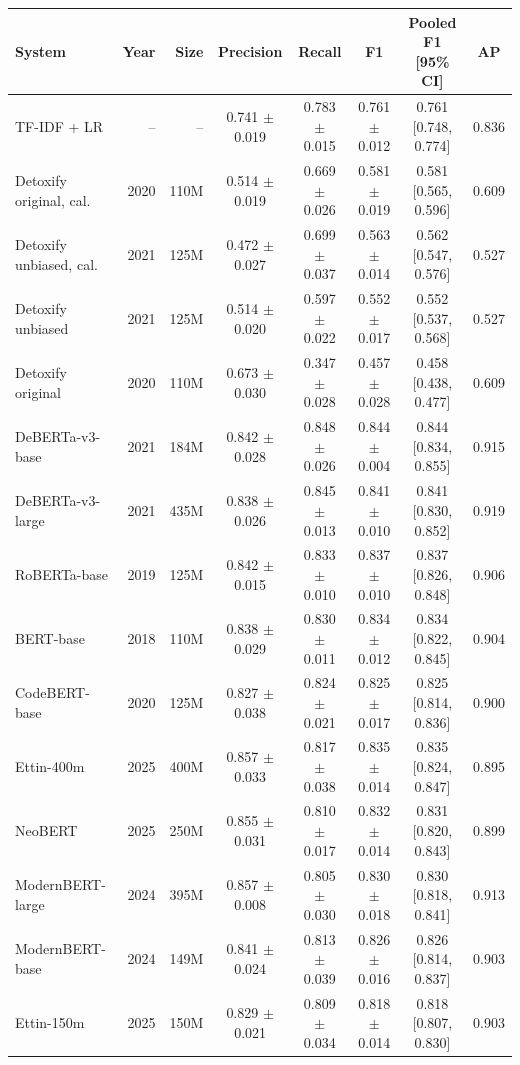 \begin{tabular}{lrrccccc}
\toprule
System & Year & Size & Precision & Recall & F1 & Pooled F1 [95\% CI] & AP \\
\midrule
TF-IDF + LR & -- & -- & 0.741 $\pm$ 0.019 & 0.783 $\pm$ 0.015 & 0.761 $\pm$ 0.012 & 0.761 [0.748, 0.774] & 0.836 \\
\midrule
Detoxify original, cal. & 2020 & 110M & 0.514 $\pm$ 0.019 & 0.669 $\pm$ 0.026 & 0.581 $\pm$ 0.019 & 0.581 [0.565, 0.596] & 0.609 \\
Detoxify unbiased, cal. & 2021 & 125M & 0.472 $\pm$ 0.027 & 0.699 $\pm$ 0.037 & 0.563 $\pm$ 0.014 & 0.562 [0.547, 0.576] & 0.527 \\
Detoxify unbiased & 2021 & 125M & 0.514 $\pm$ 0.020 & 0.597 $\pm$ 0.022 & 0.552 $\pm$ 0.017 & 0.552 [0.537, 0.568] & 0.527 \\
Detoxify original & 2020 & 110M & 0.673 $\pm$ 0.030 & 0.347 $\pm$ 0.028 & 0.457 $\pm$ 0.028 & 0.458 [0.438, 0.477] & 0.609 \\
\midrule
DeBERTa-v3-base & 2021 & 184M & 0.842 $\pm$ 0.028 & 0.848 $\pm$ 0.026 & 0.844 $\pm$ 0.004 & 0.844 [0.834, 0.855] & 0.915 \\
DeBERTa-v3-large & 2021 & 435M & 0.838 $\pm$ 0.026 & 0.845 $\pm$ 0.013 & 0.841 $\pm$ 0.010 & 0.841 [0.830, 0.852] & 0.919 \\
RoBERTa-base & 2019 & 125M & 0.842 $\pm$ 0.015 & 0.833 $\pm$ 0.010 & 0.837 $\pm$ 0.010 & 0.837 [0.826, 0.848] & 0.906 \\
BERT-base & 2018 & 110M & 0.838 $\pm$ 0.029 & 0.830 $\pm$ 0.011 & 0.834 $\pm$ 0.012 & 0.834 [0.822, 0.845] & 0.904 \\
CodeBERT-base & 2020 & 125M & 0.827 $\pm$ 0.038 & 0.824 $\pm$ 0.021 & 0.825 $\pm$ 0.017 & 0.825 [0.814, 0.836] & 0.900 \\
\midrule
Ettin-400m & 2025 & 400M & 0.857 $\pm$ 0.033 & 0.817 $\pm$ 0.038 & 0.835 $\pm$ 0.014 & 0.835 [0.824, 0.847] & 0.895 \\
NeoBERT & 2025 & 250M & 0.855 $\pm$ 0.031 & 0.810 $\pm$ 0.017 & 0.832 $\pm$ 0.014 & 0.831 [0.820, 0.843] & 0.899 \\
ModernBERT-large & 2024 & 395M & 0.857 $\pm$ 0.008 & 0.805 $\pm$ 0.030 & 0.830 $\pm$ 0.018 & 0.830 [0.818, 0.841] & 0.913 \\
ModernBERT-base & 2024 & 149M & 0.841 $\pm$ 0.024 & 0.813 $\pm$ 0.039 & 0.826 $\pm$ 0.016 & 0.826 [0.814, 0.837] & 0.903 \\
Ettin-150m & 2025 & 150M & 0.829 $\pm$ 0.021 & 0.809 $\pm$ 0.034 & 0.818 $\pm$ 0.014 & 0.818 [0.807, 0.830] & 0.903 \\
\bottomrule
\end{tabular}
